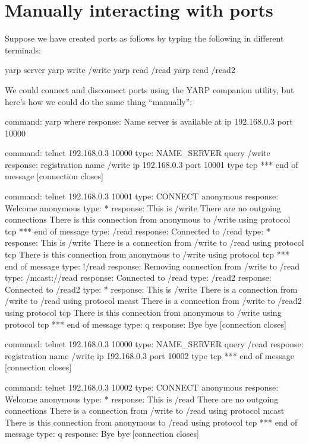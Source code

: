 \documentclass[a4]{article}
\begin{document}
\section{Manually interacting with ports}

Suppose we have created ports as follows by typing the
following in different terminals:
\begin{code}
  yarp server
  yarp write /write
  yarp read /read
  yarp read /read2
\end{code}
%
We could connect and disconnect ports using the YARP companion
utility, but here's how we could do the same thing ``manually'':

\begin{code}
command:  yarp where
response: Name server is available at ip 192.168.0.3 port 10000

command:  telnet 192.168.0.3 10000
type:     NAME_SERVER query /write
response: registration name /write ip 192.168.0.3 port 10001 type tcp
          *** end of message
          [connection closes]

command:  telnet 192.168.0.3 10001
type:     CONNECT anonymous
response: Welcome anonymous
type:     *
response: This is /write
          There are no outgoing connections
          There is this connection from anonymous to /write using protocol tcp
          *** end of message
type:     /read
response: Connected to /read
type:     *
response: This is /write
          There is a connection from /write to /read using protocol tcp
          There is this connection from anonymous to /write using protocol tcp
          *** end of message
type:     !/read
response: Removing connection from /write to /read
type:     /mcast://read
response: Connected to /read
type:     /read2
response: Connected to /read2
type:     *
response: This is /write
          There is a connection from /write to /read using protocol mcast
          There is a connection from /write to /read2 using protocol tcp
          There is this connection from anonymous to /write using protocol tcp
          *** end of message
type:     q
response: Bye bye
          [connection closes]

command:  telnet 192.168.0.3 10000
type:     NAME_SERVER query /read
response: registration name /write ip 192.168.0.3 port 10002 type tcp
          *** end of message
          [connection closes]

command:  telnet 192.168.0.3 10002
type:     CONNECT anonymous
response: Welcome anonymous
type:     *
response: This is /read
          There are no outgoing connections
          There is a connection from /write to /read using protocol mcast
          There is this connection from anonymous to /read using protocol tcp
          *** end of message
type:     q
response: Bye bye
          [connection closes]

\end{code}
\end{document}
